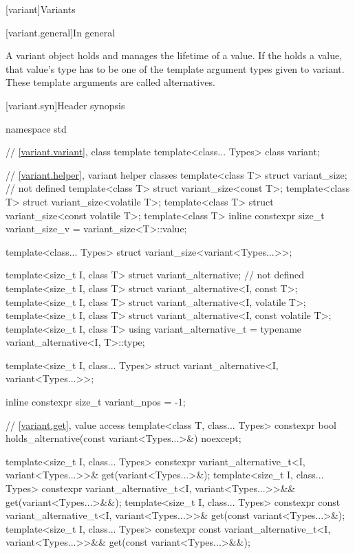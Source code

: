 [variant]{Variants}

[variant.general]{In general}

\pnum
A variant object holds and manages the lifetime of a value.
If the  holds a value, that value's type has to be one
of the template argument types given to variant.
These template arguments are called alternatives.

[variant.syn]{Header  synopsis}
%

\begin{codeblock}
namespace std {
  // \ref{variant.variant}, class template 
  template<class... Types>
    class variant;

  // \ref{variant.helper}, variant helper classes
  template<class T> struct variant_size;                   // not defined
  template<class T> struct variant_size<const T>;
  template<class T> struct variant_size<volatile T>;
  template<class T> struct variant_size<const volatile T>;
  template<class T>
    inline constexpr size_t variant_size_v = variant_size<T>::value;

  template<class... Types>
    struct variant_size<variant<Types...>>;

  template<size_t I, class T> struct variant_alternative;  // not defined
  template<size_t I, class T> struct variant_alternative<I, const T>;
  template<size_t I, class T> struct variant_alternative<I, volatile T>;
  template<size_t I, class T> struct variant_alternative<I, const volatile T>;
  template<size_t I, class T>
    using variant_alternative_t = typename variant_alternative<I, T>::type;

  template<size_t I, class... Types>
    struct variant_alternative<I, variant<Types...>>;

  inline constexpr size_t variant_npos = -1;

  // \ref{variant.get}, value access
  template<class T, class... Types>
    constexpr bool holds_alternative(const variant<Types...>&) noexcept;

  template<size_t I, class... Types>
    constexpr variant_alternative_t<I, variant<Types...>>& get(variant<Types...>&);
  template<size_t I, class... Types>
    constexpr variant_alternative_t<I, variant<Types...>>&& get(variant<Types...>&&);
  template<size_t I, class... Types>
    constexpr const variant_alternative_t<I, variant<Types...>>& get(const variant<Types...>&);
  template<size_t I, class... Types>
    constexpr const variant_alternative_t<I, variant<Types...>>&& get(const variant<Types...>&&);

}
\end{codeblock}
